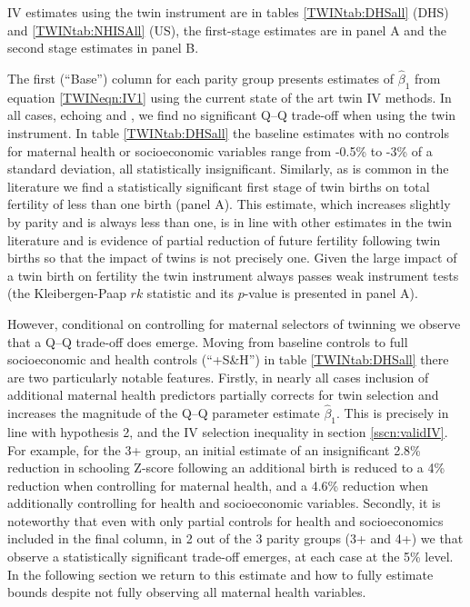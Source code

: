 \documentclass[subeqn]{article}
\begin{document}
\begin{spacing}{1.4}
IV estimates using the twin instrument are in %
tables \ref{TWINtab:DHSall} (DHS) and \ref{TWINtab:NHISAll} (US), the first-stage estimates are in panel A and the second stage estimates in panel B.  


The first (``Base'')
column for each parity group presents estimates of $\hat\beta_1$ from equation
\ref{TWINeqn:IV1} using the current state of the art twin IV methods.  In all
cases, echoing \citet{Angristetal2010,Blacketal2005,Caceres2006} and
\citet{FitzsimonsMalde2014}, we find no significant Q--Q trade-off when using
the twin instrument.  In table \ref{TWINtab:DHSall} the baseline estimates
with no controls for maternal health or socioeconomic variables range from
-0.5\% to -3\% of a standard deviation, all statistically insignificant.
Similarly, as is common in the literature we find a statistically significant
first stage of twin births on total fertility of less than one birth (panel
A).  This estimate, which increases slightly by parity and is always less than
one, is in line with other estimates in the twin literature and is evidence of
partial reduction of future fertility following twin births so that the impact
of twins is not precisely one.  Given the large impact of a twin birth on
fertility the twin instrument always passes weak instrument tests (the
Kleibergen-Paap $rk$ statistic and its $p$-value is presented in panel A).

However, conditional on controlling for maternal selectors of twinning we
observe that a Q--Q trade-off does emerge.  Moving from baseline controls to
full socioeconomic and health controls (``+S\&H'') in table
\ref{TWINtab:DHSall} there are two particularly notable features.  Firstly,
in nearly all cases inclusion of additional maternal health predictors
partially corrects for twin selection and increases the magnitude of the Q--Q
parameter estimate $\hat\beta_1$.  This is precisely in line with hypothesis
2, and the IV selection inequality in section \ref{sscn:validIV}. For
example, for the 3+ group, an initial estimate of an insignificant 2.8\%
reduction in schooling Z-score following an additional birth is reduced to a
4\% reduction when controlling for maternal health, and a 4.6\% reduction when
additionally controlling for health and socioeconomic variables.  Secondly, it
is noteworthy that even with only partial controls for health and
socioeconomics included in the final column, in 2 out of the 3 parity groups
(3+ and 4+) we that observe a statistically significant trade-off emerges,
at each case at the 5\% level.  In the following section we return to this
estimate and how to fully estimate bounds despite not fully observing all
maternal health variables.


\end{spacing}
\end{document}
